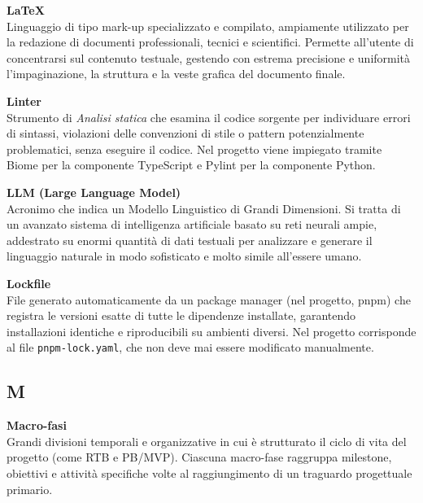 \documentclass[12pt, a4paper]{article}
\begin{document}
\noindent\hypertarget{latex}{\textbf{LaTeX}} \\[0.1em]
Linguaggio di tipo mark-up specializzato e compilato, ampiamente utilizzato per la redazione di documenti professionali, tecnici e scientifici. Permette all'utente di concentrarsi sul contenuto testuale, gestendo con estrema precisione e uniformità l'impaginazione, la struttura e la veste grafica del documento finale.
\vspace{0.5cm}

\noindent\hypertarget{linter}{\textbf{Linter}} \\[0.1em]
Strumento di \textit{Analisi statica} che esamina il codice sorgente per individuare errori di sintassi, violazioni delle convenzioni di stile o pattern potenzialmente problematici, senza eseguire il codice. Nel progetto viene impiegato tramite Biome per la componente TypeScript e Pylint per la componente Python.
\vspace{0.5cm}

\noindent\hypertarget{llm}{\textbf{LLM (Large Language Model)}} \\[0.1em]
Acronimo che indica un Modello Linguistico di Grandi Dimensioni. Si tratta di un avanzato sistema di intelligenza artificiale basato su reti neurali ampie, addestrato su enormi quantità di dati testuali per analizzare e generare il linguaggio naturale in modo sofisticato e molto simile all'essere umano.
\vspace{0.5cm}

\noindent\hypertarget{lockfile}{\textbf{Lockfile}} \\[0.1em]
File generato automaticamente da un package manager (nel progetto, pnpm) che registra le versioni esatte di tutte le dipendenze installate, garantendo installazioni identiche e riproducibili su ambienti diversi. Nel progetto corrisponde al file \texttt{pnpm-lock.yaml}, che non deve mai essere modificato manualmente.
\vspace{0.1cm}
\newpage

\subsection*{M}
{}
\vspace{0.2cm}

\noindent\hypertarget{macro-fasi}{\textbf{Macro-fasi}} \\[0.1em]
Grandi divisioni temporali e organizzative in cui è strutturato il ciclo di vita del progetto (come RTB e PB/MVP). Ciascuna macro-fase raggruppa milestone, obiettivi e attività specifiche volte al raggiungimento di un traguardo progettuale primario.
\vspace{0.5cm}
\end{document}

